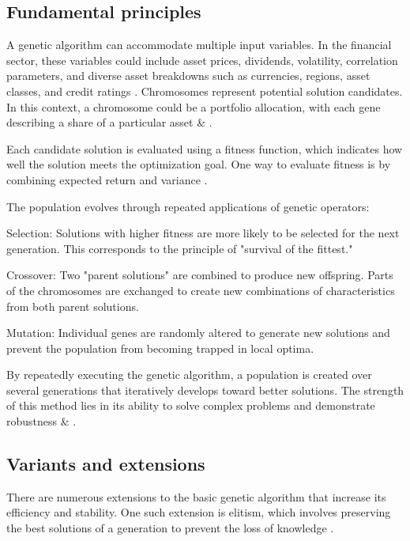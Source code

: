 \documentclass{agasthesis}
\begin{document}
\subsection{Fundamental principles}
A genetic algorithm can accommodate multiple input variables. In the financial sector, these variables could include asset prices, dividends, volatility, 
correlation parameters, and diverse asset breakdowns such as currencies, regions, asset classes, and credit ratings \cite[p. 204]{soldatos_big_2022}. 
Chromosomes represent potential solution candidates. In this context, a chromosome could be a portfolio allocation, 
with each gene describing a share of a particular asset \cite[p. 204]{soldatos_big_2022} \& \cite[p. 7]{melanie_introduction_1999}. 

Each candidate solution is evaluated using a fitness function, which indicates how well the solution meets the optimization goal. 
One way to evaluate fitness is by combining expected return and variance \cite[p. 206]{soldatos_big_2022}.

The population evolves through repeated applications of genetic operators:

Selection: Solutions with higher fitness are more likely to be selected for the next generation. 
This corresponds to the principle of "survival of the fittest."

Crossover: Two "parent solutions" are combined to produce new offspring. 
Parts of the chromosomes are exchanged to create new combinations of characteristics from both parent solutions.

Mutation: Individual genes are randomly altered to generate new solutions and prevent the population from becoming trapped in local optima.

\cite[p. 8]{melanie_introduction_1999}

By repeatedly executing the genetic algorithm, a population is created over several generations that iteratively develops toward better solutions. 
The strength of this method lies in its ability to solve complex problems and demonstrate robustness \cite[p. 27]{melanie_introduction_1999} \& \cite[p. 213]{soldatos_big_2022}.

\subsection{Variants and extensions}
There are numerous extensions to the basic genetic algorithm that increase its efficiency and stability. 
One such extension is elitism, which involves preserving the best solutions of a generation to prevent the loss of knowledge \cite{deb_fast_2002}.
\end{document}
